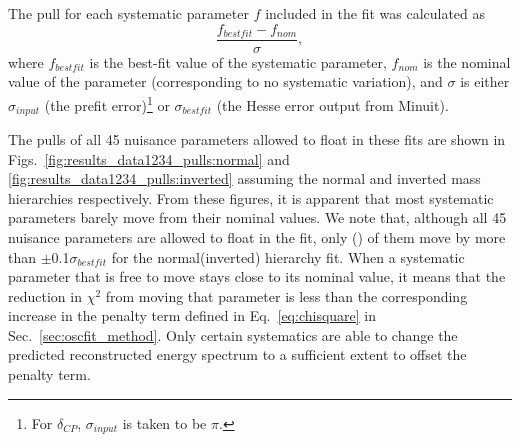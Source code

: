 The pull for each systematic parameter $f$ included in the fit was calculated as
\begin{equation}
  \frac{f_{bestfit} - f_{nom}}{\sigma},
\end{equation}
where 
$f_{bestfit}$ is the best-fit value of the systematic parameter,
$f_{nom}$ is the nominal value of the parameter (corresponding to no systematic variation), and
$\sigma$ is either $\sigma_{input}$ (the prefit error)\footnote{For $\delta_{CP}$, $\sigma_{input}$ is taken to be $\pi$.} 
or $\sigma_{bestfit}$ (the Hesse error output from Minuit).

The pulls of all 45 nuisance parameters allowed to float in these fits are shown in 
Figs.\ \ref{fig:results_data1234_pulls:normal} and \ref{fig:results_data1234_pulls:inverted} 
assuming the normal and inverted mass hierarchies respectively.
From these figures, it is apparent that most systematic parameters barely move from their nominal values.
We note that, although all 45 nuisance parameters are allowed to float in the fit,
only \resultNormalLargePulls(\resultInvertedLargePulls) of them move by more than $\pm$0.1$\sigma_{bestfit}$ for 
the normal(inverted) hierarchy fit. When a systematic parameter that is free to move stays close to its nominal 
value, it means that the reduction in $\chi^{2}$ from moving that parameter is less than the corresponding increase 
in the penalty term defined in Eq.\ \ref{eq:chisquare} in Sec.\ \ref{sec:oscfit_method}.
Only certain systematics are able to change the predicted reconstructed energy spectrum to a 
sufficient extent to offset the penalty term. 

